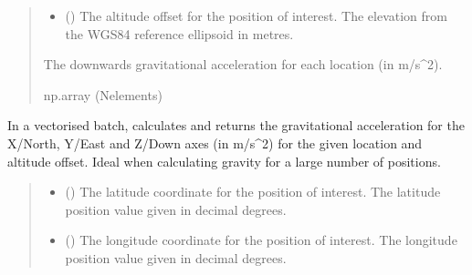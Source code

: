 \documentclass[letterpaper,10pt,english]{sphinxmanual}
\begin{document}
\begin{fulllineitems}
\begin{fulllineitems}
\begin{quote}
\begin{description}
\begin{itemize}
\item {} 
\sphinxAtStartPar
{} () \textendash{} The altitude offset for the position of interest.
The elevation from the WGS\sphinxhyphen{}84 reference ellipsoid in metres.

\end{itemize}

\sphinxAtStartPar
The downwards gravitational acceleration for each location
(in m/s\textasciicircum{}2).

\sphinxAtStartPar
np.array (N\sphinxhyphen{}elements)

\end{description}\end{quote}

\end{fulllineitems}


\begin{fulllineitems}
\label{\detokenize{modules/gravity/base:qnav.gravity.base.GravityModel.calc_gravity_xyz_vec}}
\pysigstartsignatures
{}
\pysigstopsignatures
\sphinxAtStartPar
In a vectorised batch, calculates and returns the gravitational
acceleration for the X/North, Y/East and Z/Down axes (in m/s\textasciicircum{}2)
for the given location and altitude offset. Ideal when calculating
gravity for a large number of positions.
\begin{quote}\begin{description}
\begin{itemize}
\item {} 
\sphinxAtStartPar
{} () \textendash{} The latitude coordinate for the position of interest.
The latitude position value given in decimal degrees.

\item {} 
\sphinxAtStartPar
{} () \textendash{} The longitude coordinate for the position of interest.
The longitude position value given in decimal degrees.


\end{itemize}
\end{description}
\end{quote}
\end{fulllineitems}
\end{fulllineitems}
\end{document}
